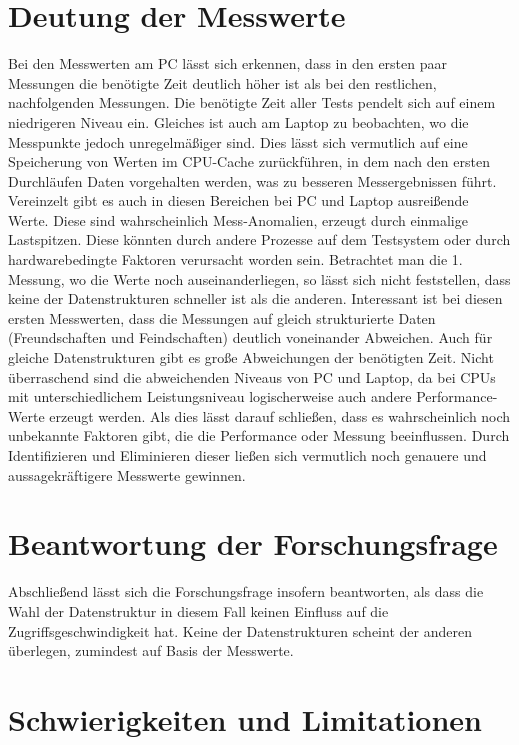 \documentclass[11pt,a4paper]{article}
\begin{document}
\section{Deutung der Messwerte}

Bei den Messwerten am PC lässt sich erkennen, dass in den ersten paar Messungen die
benötigte Zeit deutlich höher ist als bei den restlichen, nachfolgenden Messungen.
Die benötigte Zeit aller Tests pendelt sich auf einem niedrigeren Niveau ein.
Gleiches ist auch am Laptop zu beobachten, wo die Messpunkte jedoch unregelmäßiger sind.
Dies lässt sich vermutlich auf eine Speicherung von Werten im CPU-Cache zurückführen,
in dem nach den ersten Durchläufen Daten vorgehalten werden, was zu besseren
Messergebnissen führt.
Vereinzelt gibt es auch in diesen Bereichen bei PC und Laptop ausreißende Werte.
Diese sind wahrscheinlich Mess-Anomalien, erzeugt durch einmalige Lastspitzen.
Diese könnten durch andere Prozesse auf dem Testsystem oder durch hardwarebedingte 
Faktoren verursacht worden sein.
Betrachtet man die 1. Messung, wo die Werte noch auseinanderliegen,
so lässt sich nicht feststellen, dass keine der Datenstrukturen schneller
ist als die anderen. Interessant ist bei diesen ersten Messwerten, dass die Messungen
auf gleich strukturierte Daten (Freundschaften und Feindschaften) deutlich voneinander
Abweichen. Auch für gleiche Datenstrukturen gibt es große Abweichungen der
benötigten Zeit.
Nicht überraschend sind die abweichenden Niveaus von PC und Laptop,
da bei CPUs mit unterschiedlichem Leistungsniveau logischerweise auch andere
Performance-Werte erzeugt werden.
Als dies lässt darauf schließen, dass es wahrscheinlich noch
unbekannte Faktoren gibt, die die Performance oder Messung beeinflussen.
Durch Identifizieren und Eliminieren dieser ließen sich vermutlich noch
genauere und aussagekräftigere Messwerte gewinnen.

\section{Beantwortung der Forschungsfrage}

Abschließend lässt sich die Forschungsfrage insofern beantworten, als dass
die Wahl der Datenstruktur in diesem Fall keinen Einfluss auf die Zugriffsgeschwindigkeit
hat. Keine der Datenstrukturen scheint der anderen überlegen, zumindest auf Basis
der Messwerte.

\section{Schwierigkeiten und Limitationen}
\end{document}
